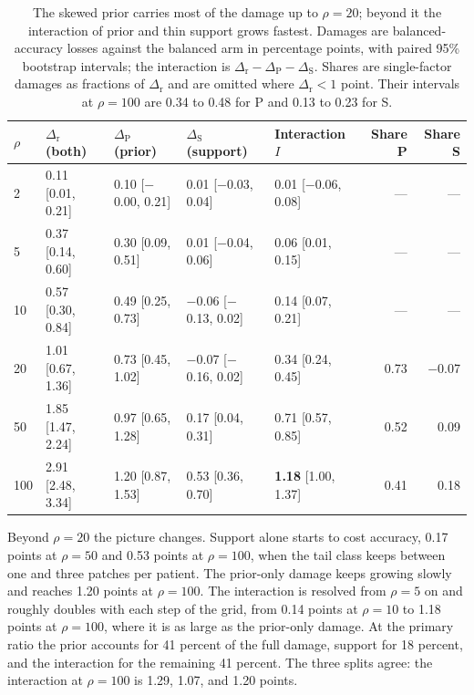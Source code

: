\begin{table}[htbp]
\centering
\small
\setlength{\tabcolsep}{4pt}
\renewcommand{\arraystretch}{1.15}
\begin{tabular}{@{}lllllrr@{}}
\toprule
$\rho$ & $\Delta_\text{r}$ (both) & $\Delta_\text{P}$ (prior) & $\Delta_\text{S}$ (support) & Interaction $I$ & Share P & Share S \\
\midrule
2 & 0.11 [0.01, 0.21] & 0.10 [$-$0.00, 0.21] & 0.01 [$-$0.03, 0.04] & 0.01 [$-$0.06, 0.08] & --- & --- \\
5 & 0.37 [0.14, 0.60] & 0.30 [0.09, 0.51] & 0.01 [$-$0.04, 0.06] & 0.06 [0.01, 0.15] & --- & --- \\
10 & 0.57 [0.30, 0.84] & 0.49 [0.25, 0.73] & $-$0.06 [$-$0.13, 0.02] & 0.14 [0.07, 0.21] & --- & --- \\
20 & 1.01 [0.67, 1.36] & 0.73 [0.45, 1.02] & $-$0.07 [$-$0.16, 0.02] & 0.34 [0.24, 0.45] & 0.73 & $-$0.07 \\
50 & 1.85 [1.47, 2.24] & 0.97 [0.65, 1.28] & 0.17 [0.04, 0.31] & 0.71 [0.57, 0.85] & 0.52 & 0.09 \\
100 & 2.91 [2.48, 3.34] & 1.20 [0.87, 1.53] & 0.53 [0.36, 0.70] & \textbf{1.18} [1.00, 1.37] & 0.41 & 0.18 \\
\bottomrule
\end{tabular}
\caption{The skewed prior carries most of the damage up to $\rho=20$; beyond it the interaction of prior and thin support grows fastest. Damages are balanced-accuracy losses against the balanced arm in percentage points, with paired 95\% bootstrap intervals; the interaction is $\Delta_\text{r}-\Delta_\text{P}-\Delta_\text{S}$. Shares are single-factor damages as fractions of $\Delta_\text{r}$ and are omitted where $\Delta_\text{r}<1$ point. Their intervals at $\rho=100$ are 0.34 to 0.48 for P and 0.13 to 0.23 for S.}
\label{tab:decomposition}
\end{table}

\noindent Beyond $\rho=20$ the picture changes. Support alone starts to cost accuracy, 0.17 points at $\rho=50$ and 0.53 points at $\rho=100$, when the tail class keeps between one and three patches per patient. The prior-only damage keeps growing slowly and reaches 1.20 points at $\rho=100$. The interaction is resolved from $\rho=5$ on and roughly doubles with each step of the grid, from 0.14 points at $\rho=10$ to 1.18 points at $\rho=100$, where it is as large as the prior-only damage. At the primary ratio the prior accounts for 41 percent of the full damage, support for 18 percent, and the interaction for the remaining 41 percent. The three splits agree: the interaction at $\rho=100$ is 1.29, 1.07, and 1.20 points.

